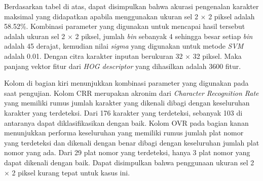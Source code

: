 Berdasarkan tabel di atas, dapat disimpulkan bahwa akurasi pengenalan karakter maksimal yang didapatkan apabila menggunakan ukuran sel 2 $\times$ 2 piksel adalah 58.52\%. Kombinasi parameter yang digunakan untuk mencapai hasil tersebut adalah ukuran sel 2 $\times$ 2 piksel, jumlah \textit{bin} sebanyak 4 sehingga besar setiap \textit{bin} adalah 45 derajat, kemudian nilai \textit{sigma} yang digunakan untuk metode \textit{SVM} adalah 0.01. Dengan citra karakter inputan berukuran 32 $\times$ 32 piksel. Maka panjang vektor fitur dari \textit{HOG descriptor} yang dihasilkan adalah 3600 fitur.

Kolom di bagian kiri menunjukkan kombinasi parameter yang digunakan pada saat pengujian. Kolom CRR merupakan akronim dari \textit{Character Recognition Rate} yang memiliki rumus jumlah karakter yang dikenali dibagi dengan keseluruhan karakter yang terdeteksi. Dari 176 karakter yang terdeteksi, sebanyak 103 di antaranya dapat diklasifikasikan dengan baik. Kolom OVR pada bagian kanan menunjukkan performa keseluruhan yang memiliki rumus jumlah plat nomor yang terdeteksi dan dikenali dengan benar dibagi dengan keseluruhan jumlah plat nomor yang ada. Dari 29 plat nomor yang terdeteksi, hanya 3 plat nomor yang dapat dikenali dengan baik. Dapat disimpulkan bahwa penggunaan ukuran sel 2 $\times$ 2 piksel kurang tepat untuk kasus ini.\\

